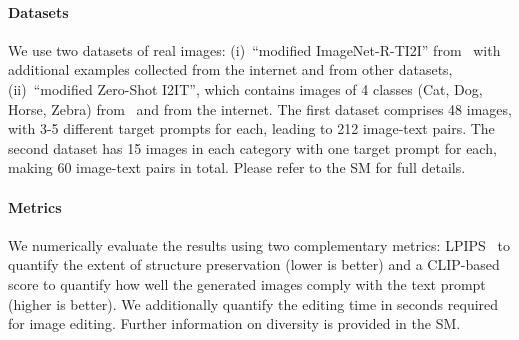 \vspace{-0.4cm}
\paragraph{Datasets} We use two datasets of real images: (i)~``modified ImageNet-R-TI2I'' from~\cite{Narek22} with additional examples collected from the internet and from other datasets, (ii)~``modified Zero-Shot I2IT'', which contains images of 4 classes (Cat, Dog, Horse, Zebra) from~\cite{Parmar23} and from the internet. The first dataset comprises 48 images, with 3-5 different target prompts for each, leading to 212 image-text pairs. The second dataset has 15 images in each category with one target prompt for each, making 60 image-text pairs in total. Please refer to the SM for full details.

\vspace{-0.4cm}
\paragraph{Metrics} We numerically evaluate the results using two complementary metrics:  LPIPS~\cite{zhang18} to quantify the extent of structure preservation (lower is better) and a CLIP-based score to quantify how well the generated images comply with the text prompt (higher is better). We additionally quantify the editing time in seconds required for image editing. Further information on diversity is provided in the SM.

\vspace{-0.4cm}
